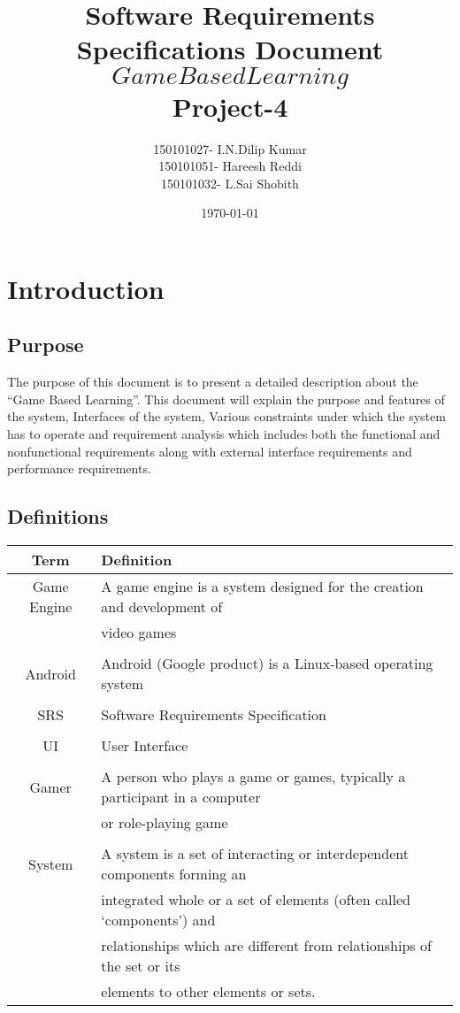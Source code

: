 \documentclass[a4paper,11pt]{article}
\begin{document}
\title{Software Requirements Specifications Document\\\(Game Based Learning\)\\Project-4}
\author{150101027- I.N.Dilip Kumar\\ 150101051- Hareesh Reddi\\ 150101032- L.Sai Shobith}
\date{\today}
\maketitle
\tableofcontents{}
\section{Introduction}

\subsection{Purpose}
	The purpose of this document is to present a detailed description about the “Game Based Learning”. This document will explain the purpose and features of the system, Interfaces of the
system, Various constraints under which the system has to operate and requirement analysis which includes both the functional and nonfunctional requirements along with external interface requirements and performance requirements.

\subsection{Definitions}
\begin{tabular}{|c|l|}
  \hline			
  Term & Definition \\ \hline
  Game Engine &A game engine is a system designed for the creation and development of \\&video games \\ &\\ \hline
 Android & Android (Google product) is a Linux-based operating system \\ &\\ \hline
SRS & Software Requirements Specification \\ &\\ \hline
UI & User Interface \\ &\\ \hline
Gamer & A person who plays a game or games, typically a participant in a computer \\&or role-playing game \\ &\\ \hline
System & A system is a set of interacting or interdependent components forming an\\& integrated whole or a set of elements (often called ‘components’) and 
\\&relationships which are different from relationships of the set or its\\& elements to other elements or sets. \\  \hline  
\end{tabular}
\end{document}
